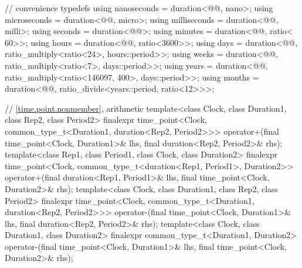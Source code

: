 \begin{codeblock}
{{    // convenience typedefs
    using nanoseconds  = duration<@@, nano>;
    using microseconds = duration<@@, micro>;
    using milliseconds = duration<@@, milli>;
    using seconds      = duration<@@>;
    using minutes      = duration<@@, ratio<  60>>;
    using hours        = duration<@@, ratio<3600>>;
    using days         = duration<@@,
                                  ratio_multiply<ratio<24>, hours::period>>;
    using weeks        = duration<@@,
                                  ratio_multiply<ratio<7>, days::period>>;
    using years        = duration<@@,
                                  ratio_multiply<ratio<146097, 400>, days::period>>;
    using months       = duration<@@,
                                  ratio_divide<years::period, ratio<12>>>;

    // \ref{time.point.nonmember},  arithmetic
    template<class Clock, class Duration1, class Rep2, class Period2>
      finalexpr time_point<Clock, common_type_t<Duration1, duration<Rep2, Period2>>>
        operator+(final time_point<Clock, Duration1>& lhs, final duration<Rep2, Period2>& rhs);
    template<class Rep1, class Period1, class Clock, class Duration2>
      finalexpr time_point<Clock, common_type_t<duration<Rep1, Period1>, Duration2>>
        operator+(final duration<Rep1, Period1>& lhs, final time_point<Clock, Duration2>& rhs);
    template<class Clock, class Duration1, class Rep2, class Period2>
      finalexpr time_point<Clock, common_type_t<Duration1, duration<Rep2, Period2>>>
        operator-(final time_point<Clock, Duration1>& lhs, final duration<Rep2, Period2>& rhs);
    template<class Clock, class Duration1, class Duration2>
      finalexpr common_type_t<Duration1, Duration2>
        operator-(final time_point<Clock, Duration1>& lhs,
                  final time_point<Clock, Duration2>& rhs);

}}
\end{codeblock}
